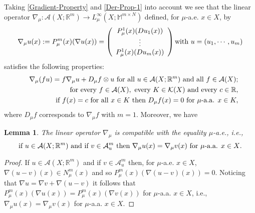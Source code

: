 \documentclass[10pt]{amsart}
\numberwithin{equation}{section}
\newtheorem{lemma}[theorem]{Lemma}
\theoremstyle{definition}
\theoremstyle{remark}
\begin{document}
Taking \eqref{Gradient-Property} and \eqref{Der-Prop-1} into account we see that the linear operator $\nabla_\mu:\mathcal{A}(X;{{\mathbb R}}^m)\to L^\infty_\mu(X;{{\mathbb M}^{m\times N}})$ defined, for $\mu$-a.e. $x\in X$, by 
\begin{equation}\label{mu-vectorial-D}
\nabla_\mu u(x):=P_\mu^m(x)(\nabla u(x))=\left(
\begin{array}{c}
P_\mu^1(x)(Du_1(x))\\
\vdots\\ 
P_\mu^1(x)(Du_m(x))
\end{array}
\right)
\hbox{with } u=(u_1,\cdots,u_m)
\end{equation}
satisfies the following properties:
\begin{eqnarray}
&&\nabla_\mu (f u)=f\nabla_\mu u+D_\mu f\otimes u\hbox{ for all }u\in\mathcal{A}(X;{{\mathbb R}}^m)\hbox{ and all }f\in\mathcal{A}(X);\label{MU-Gradient-Property}\\
&&\hbox{for every }f\in\mathcal{A}(X),\hbox{ every }K\in\mathcal{K}(X)\hbox{ and every }c\in{{\mathbb R}},\label{MU-Der-Prop-1}\\ 
&&\hbox{if }f(x)=c\hbox{ for all }x\in K\hbox{ then }D_\mu f(x)=0\hbox{ for }\mu\hbox{-a.a.  }x\in K,\nonumber
\end{eqnarray}
where $D_\mu f$ corresponds to $\nabla_\mu f$ with $m=1$.  Moreover, we have
\begin{lemma}\label{comp-EquA-mu-aa}
The linear operator $\nabla_\mu$ is compatible with the equality $\mu$-a.e., i.e.,
\begin{equation}\label{Lemma-Compatible-with-mu-a.e.}
  \hbox{if }u\in \mathcal{A}(X;{{\mathbb R}}^m)\hbox{ and if } v\in\mathcal{A}_u^m\hbox{ then } \nabla_\mu u(x)=\nabla_\mu v(x) \hbox { for $\mu$-a.a. $x\in X$.}
\end{equation}
\end{lemma}
\begin{proof}
If $u\in \mathcal{A}(X;{{\mathbb R}}^m)$ and if $v\in\mathcal{A}^m_u$ then, for $\mu$-a.e. $x\in X$, $\nabla (u-v)(x)\in N_\mu^m(x)$ and so $P^m_\mu(x)(\nabla (u-v)(x))=0$. Noticing that $\nabla u=\nabla v+\nabla (u-v)$ it follows that $P_\mu^m(x)(\nabla u(x))=P_\mu^m(x)(\nabla v(x))$ for $\mu$-a.a. $x\in X$, i.e., $\nabla_\mu u(x)=\nabla_\mu v(x)$ for $\mu$-a.a. $x\in X$. 
\end{proof}

\medskip
\end{document}
